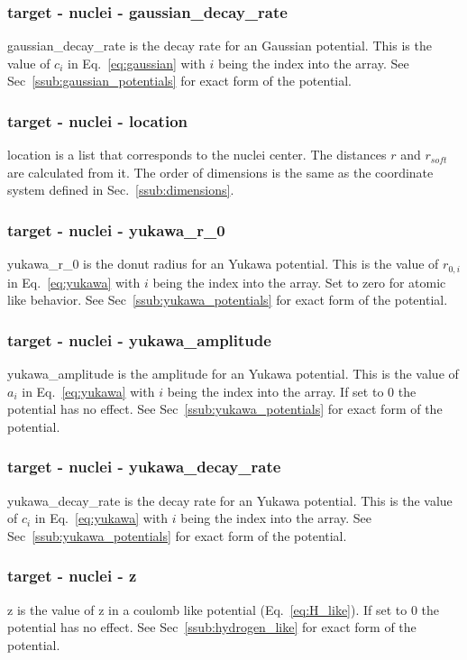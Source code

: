 \documentclass{article}
\begin{document}
\subsubsection{target - nuclei - gaussian\_decay\_rate}
gaussian\_decay\_rate is the decay rate for an Gaussian potential. This is the value of $c_i$ in Eq.~\ref{eq:gaussian} with $i$ being the index into the array. See Sec~\ref{ssub:gaussian_potentials} for exact form of the potential.

\subsubsection{target - nuclei - location}
location is a list that corresponds to the nuclei center. The distances $r$ and $r_{soft}$ are calculated from it. The order of dimensions is the same as the coordinate system defined in Sec.~\ref{ssub:dimensions}.

\subsubsection{target - nuclei - yukawa\_r\_0}
yukawa\_r\_0 is the donut radius for an Yukawa potential. This is the value of $r_{0,i}$ in Eq.~\ref{eq:yukawa} with $i$ being the index into the array. Set to zero for atomic like behavior. See Sec~\ref{ssub:yukawa_potentials} for exact form of the potential.

\subsubsection{target - nuclei - yukawa\_amplitude}
yukawa\_amplitude is the amplitude for an Yukawa potential. This is the value of $a_i$ in Eq.~\ref{eq:yukawa} with $i$ being the index into the array. If set to 0 the potential has no effect. See Sec~\ref{ssub:yukawa_potentials} for exact form of the potential.

\subsubsection{target - nuclei - yukawa\_decay\_rate}
yukawa\_decay\_rate is the decay rate for an Yukawa potential. This is the value of $c_i$ in Eq.~\ref{eq:yukawa} with $i$ being the index into the array. See Sec~\ref{ssub:yukawa_potentials} for exact form of the potential.

\subsubsection{target - nuclei - z}
z is the value of z in a coulomb like potential (Eq.~\ref{eq:H_like}). If set to 0 the potential has no effect. See Sec~\ref{ssub:hydrogen_like} for exact form of the potential.
\end{document}
